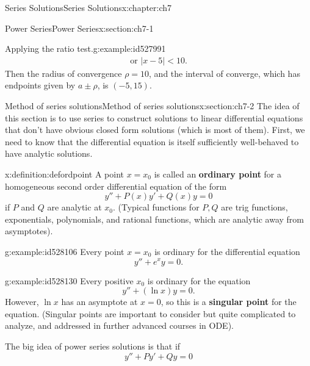 \documentclass[oneside,10pt,]{book}
\newcommand{\terminology}[1]{\textbf{#1}}
\numberwithin{equation}{section}
\newcommand{\abs}[1]{\left\vert#1\right\vert}
\numberwithin{equation}{section}
\newcommand{\lt}{<}
\begin{document}
\begin{chapterptx}{Series Solutions}{}{Series Solutions}{}{}{x:chapter:ch7}
\begin{sectionptx}{Power Series}{}{Power Series}{}{}{x:section:ch7-1}
\begin{example}{Applying the ratio test.}{g:example:id527991}
\begin{align*}
\text{or } \abs{x-5} \lt 10.
\end{align*}
Then the radius of convergence \(\rho = 10\), and the interval of converge, which has endpoints given by \(a \pm \rho\), is \((-5,15)\).%
\end{example}
\end{sectionptx}
%
%
\typeout{************************************************}
\typeout{************************************************}
%
\begin{sectionptx}{Method of series solutions}{}{Method of series solutions}{}{}{x:section:ch7-2}
The idea of this section is to use series to construct solutions to linear differential equations that don't have obvious closed form solutions (which is most of them). First, we need to know that the differential equation is itself sufficiently well-behaved to have analytic solutions.%
\begin{definition}{}{x:definition:defordpoint}%
A point \(x=x_0\) is called an \terminology{ordinary point} for a homogeneous second order differential equation of the form%
\begin{equation*}
y'' + P(x)y' + Q(x)y = 0
\end{equation*}
if \(P\) and \(Q\) are analytic at \(x_0\). (Typical functions for \(P,Q\) are trig functions, exponentials, polynomials, and rational functions, which are analytic away from asymptotes).%
\end{definition}
\begin{example}{}{g:example:id528106}%
Every point \(x=x_0\) is ordinary for the differential equation%
\begin{equation*}
y'' + e^x y = 0.
\end{equation*}
%
\end{example}
\begin{example}{}{g:example:id528130}%
Every positive \(x_0\) is ordinary for the equation%
\begin{equation*}
y'' + (\ln x) y = 0.
\end{equation*}
However, \(\ln x\) has an asymptote at \(x=0\), so this is a \terminology{singular point} for the equation. (Singular points are important to consider but quite complicated to analyze, and addressed in further advanced courses in ODE).%
\end{example}
The big idea of power series solutions is that if%
\begin{equation*}
y'' + P y' + Q y = 0
\end{equation*}

\end{sectionptx}
\end{chapterptx}
\end{document}
